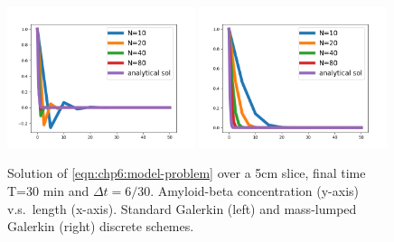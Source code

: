 \begin{figure}	
\includegraphics[width=0.49\textwidth]{./chapters/chp6/FIG/Amyloid_numerical_1D_L_max50_dt300_final1800_lumpednot.png}
\includegraphics[width=0.49\textwidth]{./chapters/chp6/FIG/Amyloid_numerical_1D_L_max50_dt300_final1800_lumpedlumped.png}
\caption{
Solution of \eqref{eqn:chp6:model-problem} over a 5cm slice, final time T=30 min and $\Delta t = 6/30$. 
Amyloid-beta concentration (y-axis) v.s.~length (x-axis). Standard Galerkin (left) and mass-lumped 
Galerkin (right) discrete schemes. 
}
\label{fig:chp6:numerics1}
\end{figure}

